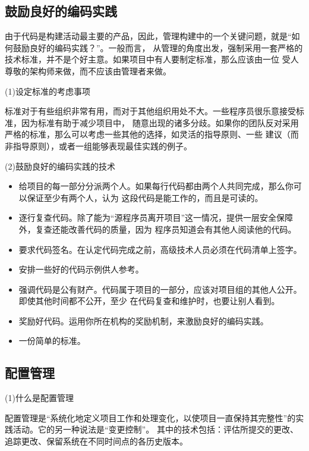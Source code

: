 \documentclass{article}
\begin{document}
\subsection{鼓励良好的编码实践}
由于代码是构建活动最主要的产品，因此，管理构建中的一个关键问题，就是“如何鼓励良好的编码实践？”。一般而言，
从管理的角度出发，强制采用一套严格的技术标准，并不是个好主意。如果项目中有人要制定标准，那么应该由一位
受人尊敬的架构师来做，而不应该由管理者来做。

\par
(1)设定标准的考虑事项
\par
标准对于有些组织非常有用，而对于其他组织用处不大。一些程序员很乐意接受标准，因为标准有助于减少项目中，
随意出现的诸多分歧。如果你的团队反对采用严格的标准，那么可以考虑一些其他的选择，如灵活的指导原则、一些
建议（而非指导原则），或者一组能够表现最佳实践的例子。

\par
(2)鼓励良好的编码实践的技术
\par
\begin{itemize}
    \item 给项目的每一部分分派两个人。如果每行代码都由两个人共同完成，那么你可以保证至少有两个人，认为
    这段代码是能工作的，而且是可读的。
    \item 逐行复查代码。除了能为“源程序员离开项目”这一情况，提供一层安全保障外，复查还能改善代码的质量，因为
    程序员知道会有其他人阅读他的代码。
    \item 要求代码签名。在认定代码完成之前，高级技术人员必须在代码清单上签字。
    \item 安排一些好的代码示例供人参考。
    \item 强调代码是公有财产。代码属于项目的一部分，应该对项目组的其他人公开。即使其他时间都不公开，至少
    在代码复查和维护时，也要让别人看到。
    \item 奖励好代码。运用你所在机构的奖励机制，来激励良好的编码实践。
    \item 一份简单的标准。
\end{itemize}

\subsection{配置管理}
\par
(1)什么是配置管理
\par
配置管理是“系统化地定义项目工作和处理变化，以使项目一直保持其完整性”的实践活动。它的另一种说法是“变更控制”。
其中的技术包括：评估所提交的更改、追踪更改、保留系统在不同时间点的各历史版本。
\end{document}
